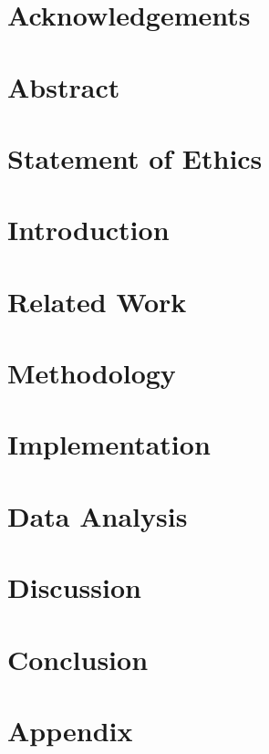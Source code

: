 \documentclass[12pt]{extreport}
\begin{document}
    \chapter*{Acknowledgements}
    \label{cha:acks}
    
    
    \chapter*{Abstract}
    \label{cha:abstract}
    

    \chapter*{Statement of Ethics}
    \label{cha:ethics}
    

    \tableofcontents
    \listoffigures
    \listoftables

    \chapter{Introduction}
    \label{cha:introduction}
    \setcounter{page}{1}
    

    \chapter{Related Work}
    \label{cha:lit_review}
    

    \chapter{Methodology}
    \label{cha:methodology}
    

    \chapter{Implementation}
    \label{cha:implementation}
    

    \chapter{Data Analysis}
    \label{cha:results}
    

    \chapter{Discussion}
    \label{cha:discussion}
    

    \chapter{Conclusion}
    \label{cha:conclusion}
    

    \appendix
    \chapter{Appendix}
    \label{cha:appendix}
    

    \nocite{*}
    
    
\end{document}
